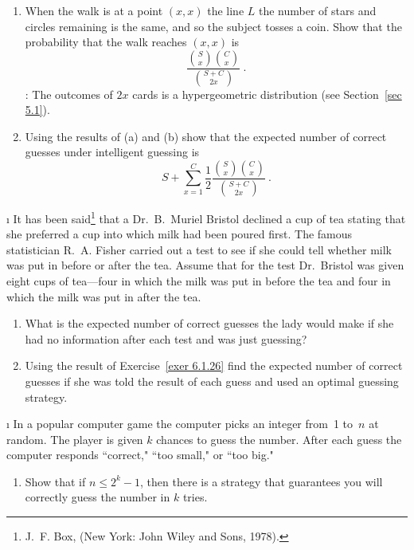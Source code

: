 \begin{LJSItem}
\begin{enumerate}
\item When the walk is at a point $(x,x)$  the line $L$ the number of stars
and circles remaining is the same, and so the subject tosses a coin.  Show that the
probability that the walk reaches $(x,x)$ is
$$
\frac{{S \choose x}{C \choose x}}{{{S + C} \choose {2x}}}\ .
$$ : The outcomes of $2x$ cards is a hypergeometric distribution (see
Section~\ref{sec 5.1}).

\item Using the results of (a) and (b) show that the expected number of correct
guesses under intelligent guessing is
$$ S + \sum_{x = 1}^C \frac12 \frac{{S \choose x}{C \choose x}}{{{S + C} \choose
{2x}}}\ .
$$
\end{enumerate}

\i\label{exer 6.1.27} It has been said\footnote{J.~F. Box,   (New York: John Wiley and Sons, 1978).} that a Dr.~B.~Muriel
Bristol declined a cup of tea stating that she preferred a cup into which
milk had been poured first.  The famous statistician R.~A. Fisher
carried out a test to see if she could tell whether milk was put in before or after the tea. 
Assume that for the test Dr.~Bristol was given eight cups of tea---four in which the milk was put in
before the tea and four in which the milk was put in after the tea.

\begin{enumerate}
\item What is the expected number of correct guesses the lady would make if she had
no information after each test and was just guessing?

\item Using the result of Exercise~\ref{exer 6.1.26} find the expected number of
correct guesses if she was told the result of each guess and used an optimal guessing
strategy.
\end{enumerate}

\i\label{exer 6.1.28} In a popular computer game the computer picks an integer
from~1 to~$n$ at random.  The player is given $k$ chances to guess the number.  After
each guess the computer responds ``correct," ``too small," or ``too big."

\begin{enumerate}
\item Show that if $n \leq 2^k - 1$, then there is a strategy that guarantees you
will correctly guess the number in $k$ tries.


\end{enumerate}
\end{LJSItem}
